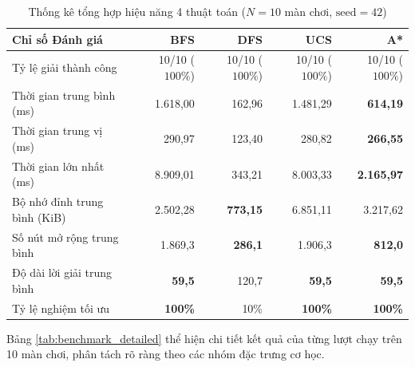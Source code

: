 \begin{table}[H]
\centering
\caption{Thống kê tổng hợp hiệu năng 4 thuật toán
($N=10$ màn chơi, $\text{seed}=42$)}
\label{tab:benchmark_summary}
\small
\begin{tabular}{lrrrr}
\toprule
\textbf{Chỉ số Đánh giá}
& \textbf{BFS} & \textbf{DFS} & \textbf{UCS} & \textbf{A*} \\
\midrule
Tỷ lệ giải thành công
& 10/10 ($100\%$) & 10/10 ($100\%$) & 10/10 ($100\%$) & 10/10 ($100\%$) \\
Thời gian trung bình (ms) & 1.618,00 & 162,96 & 1.481,29 & \textbf{614,19} \\
Thời gian trung vị (ms) & 290,97 & 123,40 & 280,82 & \textbf{266,55} \\
Thời gian lớn nhất (ms) & 8.909,01 & 343,21 & 8.003,33 & \textbf{2.165,97} \\
Bộ nhớ đỉnh trung bình (KiB)
& 2.502,28 & \textbf{773,15} & 6.851,11 & 3.217,62 \\
Số nút mở rộng trung bình
& 1.869,3 & \textbf{286,1} & 1.906,3 & \textbf{812,0} \\
Độ dài lời giải trung bình
& \textbf{59,5} & 120,7 & \textbf{59,5} & \textbf{59,5} \\
Tỷ lệ nghiệm tối ưu & \textbf{100\%} & 10\% & \textbf{100\%} & \textbf{100\%} \\
\bottomrule
\end{tabular}
\end{table}

Bảng \ref{tab:benchmark_detailed} thể hiện chi tiết kết quả của từng
lượt chạy trên 10 màn chơi, phân tách rõ ràng theo các nhóm đặc trưng
cơ học.

